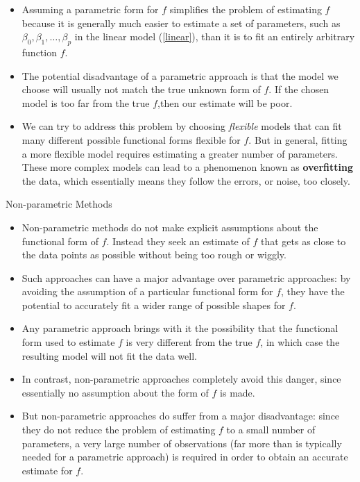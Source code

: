 \documentclass[10pt,a4paper]{beamer}
\begin{document}
\begin{frame}{}

\begin{itemize}
  \item Assuming a parametric form for $f$ simplifies the problem of
estimating $f$ because it is generally much easier to estimate a set of parameters, such as $\beta_0,\beta_1,\dots,\beta_p$ in the linear model (\ref{linear}), than it is to fit
an entirely arbitrary function $f$.
  \item The potential disadvantage of a parametric approach is that the model we choose will usually not match the true
unknown form of $f$. If the chosen model is too far from the true $f$,then
our estimate will be poor.
  \item We can try to address this problem by choosing \emph{flexible} models that can fit many different possible functional forms flexible
for $f$. But in general, fitting a more flexible model requires estimating a
greater number of parameters. These more complex models can lead to a
phenomenon known as \textbf{overfitting} the data, which essentially means they follow the errors, or noise, too closely.
\end{itemize}

\end{frame}


\begin{frame}{Non-parametric Methods}
\begin{itemize}
  \item Non-parametric methods do not make explicit assumptions about the functional form of $f$. Instead they seek an estimate of $f$ that gets as close to the
data points as possible without being too rough or wiggly.
  \item Such approaches can have a major advantage over parametric approaches: by avoiding the assumption of a particular functional form for $f$, they have the potential to accurately fit a wider range of possible shapes for $f$.
  \item Any parametric approach brings with it the possibility that the functional form used to
estimate $f$ is very different from the true $f$, in which case the resulting
model will not fit the data well.
\item In contrast, non-parametric approaches completely avoid this danger, since essentially no assumption about the form of $f$ is made.
\item But non-parametric approaches do suffer from a major disadvantage: since they do not reduce the problem of estimating $f$ to a small number of parameters, a very large number of observations (far more than is typically needed for a parametric approach) is required in order to obtain an accurate estimate for $f$.
\end{itemize}

\end{frame}
\end{document}
